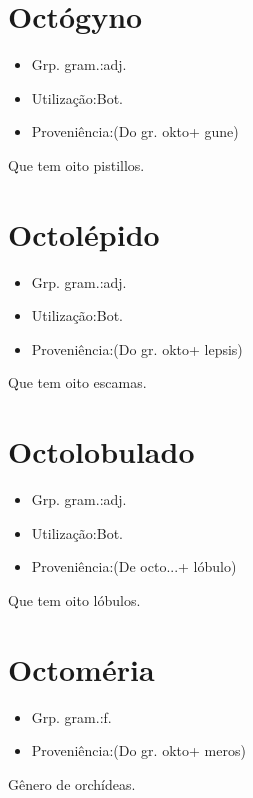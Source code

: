 \section{Octógyno}
\begin{itemize}
\item {Grp. gram.:adj.}
\end{itemize}
\begin{itemize}
\item {Utilização:Bot.}
\end{itemize}
\begin{itemize}
\item {Proveniência:(Do gr. \textunderscore okto\textunderscore  + \textunderscore gune\textunderscore )}
\end{itemize}
Que tem oito pistillos.
\section{Octolépido}
\begin{itemize}
\item {Grp. gram.:adj.}
\end{itemize}
\begin{itemize}
\item {Utilização:Bot.}
\end{itemize}
\begin{itemize}
\item {Proveniência:(Do gr. \textunderscore okto\textunderscore  + \textunderscore lepsis\textunderscore )}
\end{itemize}
Que tem oito escamas.
\section{Octolobulado}
\begin{itemize}
\item {Grp. gram.:adj.}
\end{itemize}
\begin{itemize}
\item {Utilização:Bot.}
\end{itemize}
\begin{itemize}
\item {Proveniência:(De \textunderscore octo...\textunderscore  + \textunderscore lóbulo\textunderscore )}
\end{itemize}
Que tem oito lóbulos.
\section{Octoméria}
\begin{itemize}
\item {Grp. gram.:f.}
\end{itemize}
\begin{itemize}
\item {Proveniência:(Do gr. \textunderscore okto\textunderscore  + \textunderscore meros\textunderscore )}
\end{itemize}
Gênero de orchídeas.
